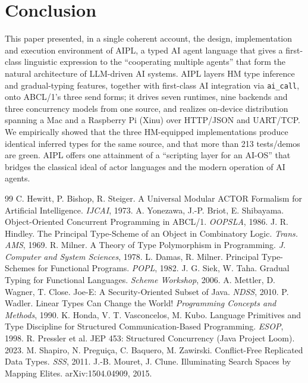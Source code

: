 \documentclass[11pt,a4paper]{article}
\newcommand{\code}[1]{\texttt{\small #1}}
\begin{document}
\section{Conclusion}\label{sec:concl}
This paper presented, in a single coherent account, the design,
implementation and execution environment of AIPL, a typed AI agent
language that gives a first-class linguistic expression to the
``cooperating multiple agents'' that form the natural architecture of
LLM-driven AI systems. AIPL layers HM type inference and gradual-typing
features, together with first-class AI integration via \code{ai\_call},
onto ABCL/1's three send forms; it drives seven runtimes, nine backends
and three concurrency models from one source, and realizes on-device
distribution spanning a Mac and a Raspberry Pi (Xinu) over HTTP/JSON and
UART/TCP. We empirically showed that the three HM-equipped
implementations produce identical inferred types for the same source, and
that more than 213 tests/demos are green. AIPL offers one attainment of a
``scripting layer for an AI-OS'' that bridges the classical ideal of
actor languages and the modern operation of AI agents.

\begin{thebibliography}{99}
 C. Hewitt, P. Bishop, R. Steiger.
  A Universal Modular ACTOR Formalism for Artificial Intelligence.
  \textit{IJCAI}, 1973.
 A. Yonezawa, J.-P. Briot, E. Shibayama.
  Object-Oriented Concurrent Programming in ABCL/1.
  \textit{OOPSLA}, 1986.
 J. R. Hindley.
  The Principal Type-Scheme of an Object in Combinatory Logic.
  \textit{Trans. AMS}, 1969.
 R. Milner.
  A Theory of Type Polymorphism in Programming.
  \textit{J. Computer and System Sciences}, 1978.
 L. Damas, R. Milner.
  Principal Type-Schemes for Functional Programs.
  \textit{POPL}, 1982.
 J. G. Siek, W. Taha.
  Gradual Typing for Functional Languages.
  \textit{Scheme Workshop}, 2006.
 A. Mettler, D. Wagner, T. Close.
  Joe-E: A Security-Oriented Subset of Java.
  \textit{NDSS}, 2010.
 P. Wadler.
  Linear Types Can Change the World!
  \textit{Programming Concepts and Methods}, 1990.
 K. Honda, V. T. Vasconcelos, M. Kubo.
  Language Primitives and Type Discipline for Structured
  Communication-Based Programming. \textit{ESOP}, 1998.
 R. Pressler et al.
  JEP 453: Structured Concurrency (Java Project Loom). 2023.
 M. Shapiro, N. Pregui\c{c}a, C. Baquero, M. Zawirski.
  Conflict-Free Replicated Data Types. \textit{SSS}, 2011.
 J.-B. Mouret, J. Clune.
  Illuminating Search Spaces by Mapping Elites. arXiv:1504.04909, 2015.
\end{thebibliography}
\end{document}
